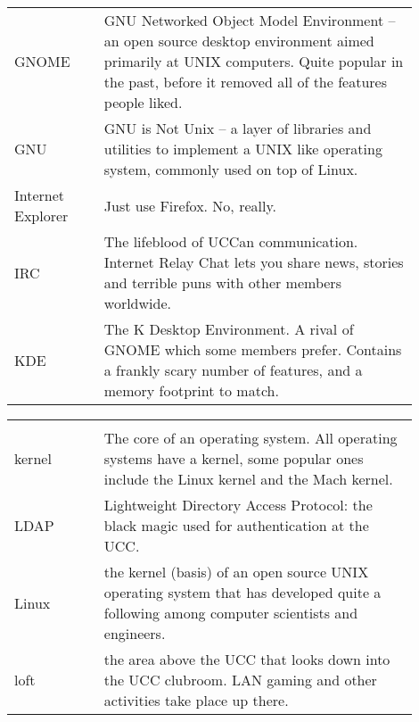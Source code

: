 {\begin{tabular}{p{0.2\linewidth}|p{0.7\linewidth}}
GNOME &
GNU Networked Object Model Environment -- an open source desktop environment aimed primarily at UNIX computers. Quite popular in the past, before it removed all of the features people liked. \\
GNU &
GNU is Not Unix -- a layer of libraries and utilities to implement a UNIX like operating system, commonly used on top of Linux. \\
Internet Explorer &
Just use Firefox. No, really. \\
IRC &
The lifeblood of UCCan communication. Internet Relay Chat lets you share news, stories and terrible puns with other members worldwide. \\
KDE &
The K Desktop Environment. A rival of GNOME which some members prefer. Contains a frankly scary number of features, and a memory footprint to match. \\

\end{tabular}

\begin{tabular}{p{0.2\linewidth}|p{0.7\linewidth}}
	\rowcolor{black} \color{white}{Term} & \color{white}{Translation} \\
kernel &
The core of an operating system. All operating systems have a kernel, some popular ones include the Linux kernel and the Mach kernel. \\
LDAP &
Lightweight Directory Access Protocol: the black magic used for authentication at the UCC. \\
Linux &
the kernel (basis) of an open source UNIX operating system that has developed quite a following among computer scientists and engineers. \\
loft &
the area above the UCC that looks down into the UCC clubroom. LAN gaming and other activities take place up there. \\


\end{tabular}}
